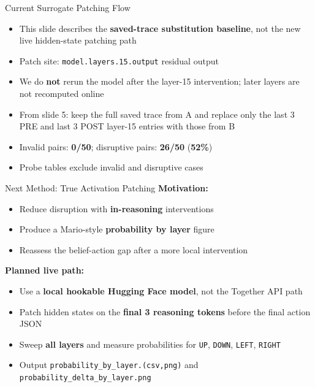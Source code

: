 \documentclass[aspectratio=169]{beamer}
\begin{document}
\begin{frame}{Current Surrogate Patching Flow}
\vspace{0.5em}
\begin{itemize}
  \item This slide describes the \textbf{saved-trace substitution baseline}, not the new live hidden-state patching path
  \item Patch site: \texttt{model.layers.15.output} residual output
  \item We do \textbf{not} rerun the model after the layer-15 intervention; later layers are not recomputed online
  \item From slide 5: keep the full saved trace from A and replace only the last 3 PRE and last 3 POST layer-15 entries with those from B
  \item Invalid pairs: \textbf{0/50}; disruptive pairs: \textbf{26/50} (\textbf{52\%})
  \item Probe tables exclude invalid and disruptive cases
\end{itemize}
\end{frame}

\begin{frame}{Next Method: True Activation Patching}
\textbf{Motivation:}
\begin{itemize}
  \item Reduce disruption with \textbf{in-reasoning} interventions
  \item Produce a Mario-style \textbf{probability by layer} figure
  \item Reassess the belief-action gap after a more local intervention
\end{itemize}

\vspace{0.5em}
\textbf{Planned live path:}
\begin{itemize}
  \item Use a \textbf{local hookable Hugging Face model}, not the Together API path
  \item Patch hidden states on the \textbf{final 3 reasoning tokens} before the final action JSON
  \item Sweep \textbf{all layers} and measure probabilities for \texttt{UP}, \texttt{DOWN}, \texttt{LEFT}, \texttt{RIGHT}
  \item Output \texttt{probability\_by\_layer.(csv,png)} and \texttt{probability\_delta\_by\_layer.png}
\end{itemize}
\end{frame}
\end{document}
